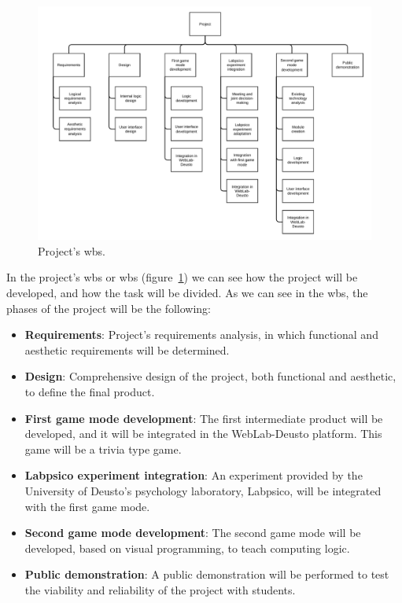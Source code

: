 \begin{figure}
	\centering
	\includegraphics[height=0.9\textwidth, angle=-90]{fig/wbs}
	\caption{Project's \acrlong{wbs}.}\label{fig:wbs}
\end{figure}

In the project's \acrlong{wbs} or \acrshort{wbs} (figure~\ref{fig:wbs}) we can see how the project
will be developed, and how the task will be divided. As we can see in the \acrshort{wbs}, the phases
of the project will be the following:

\begin{itemize}
\item \textbf{Requirements}: Project's requirements analysis, in which functional and aesthetic
requirements will be determined.

\item \textbf{Design}: Comprehensive design of the project, both functional and aesthetic, to define
the final product.

\item \textbf{First game mode development}: The first intermediate product will be developed, and it
will be integrated in the WebLab-Deusto platform. This game will be a trivia type game.

\item \textbf{Labpsico experiment integration}: An experiment provided by the University of Deusto's
psychology laboratory, Labpsico, will be integrated with the first game mode.

\item \textbf{Second game mode development}: The second game mode will be developed, based on visual
programming, to teach computing logic.

\item \textbf{Public demonstration}: A public demonstration will be performed to test the viability
and reliability of the project with students.
\end{itemize}

